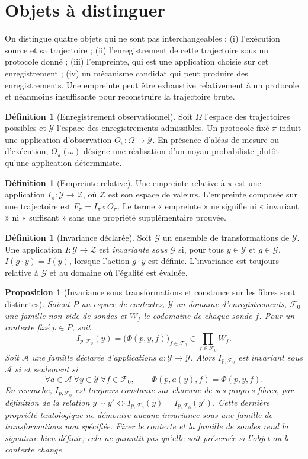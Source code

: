 \documentclass[11pt,oneside]{book}
\newtheorem{proposition}[theoreme]{Proposition}
\theoremstyle{definition}
\newtheorem{definition}[theoreme]{Définition}
\theoremstyle{remark}
\newcommand{\Y}{\mathcal Y}
\newcommand{\Z}{\mathcal Z}
\newcommand{\Fcal}{\mathcal F}
\newcommand{\1}{\mathbf 1}
\begin{document}
\section{Objets à distinguer}
On distingue quatre objets qui ne sont pas interchangeables : (i) l'exécution source et sa trajectoire ; (ii) l'enregistrement de cette trajectoire sous un protocole donné ; (iii) l'empreinte, qui est une application choisie sur cet enregistrement ; (iv) un mécanisme candidat qui peut produire des enregistrements. Une empreinte peut être exhaustive relativement à un protocole et néanmoins insuffisante pour reconstruire la trajectoire brute.

\begin{definition}[Enregistrement observationnel]
Soit \(\Omega\) l'espace des trajectoires possibles et \(\Y\) l'espace des enregistrements admissibles. Un protocole fixé \(\pi\) induit une application d'observation \(O_\pi:\Omega\to\Y\). En présence d'aléas de mesure ou d'exécution, \(O_\pi(\omega)\) désigne une réalisation d'un noyau probabiliste plutôt qu'une application déterministe.
\end{definition}
\begin{definition}[Empreinte relative]
Une empreinte relative à \(\pi\) est une application \(I_\pi:\Y\to\Z\), où \(\Z\) est son espace de valeurs. L'empreinte composée sur une trajectoire est \(F_\pi=I_\pi\circ O_\pi\). Le terme « empreinte » ne signifie ni « invariant » ni « suffisant » sans une propriété supplémentaire prouvée.
\end{definition}
\begin{definition}[Invariance déclarée]
Soit \(\mathcal G\) un ensemble de transformations de \(\Y\). Une application \(I:\Y\to\Z\) est \emph{invariante sous} \(\mathcal G\) si, pour tous \(y\in\Y\) et \(g\in\mathcal G\), \(I(g\cdot y)=I(y)\), lorsque l'action \(g\cdot y\) est définie. L'invariance est toujours relative à \(\mathcal G\) et au domaine où l'égalité est évaluée.
\end{definition}
\begin{proposition}[Invariance sous transformations et constance sur les fibres sont distinctes]
Soient $P$ un espace de contextes, $\Y$ un domaine d'enregistrements, $\Fcal_0$ une famille non vide de sondes et $W_f$ le codomaine de chaque sonde $f$. Pour un contexte fixé $p\in P$, soit
\[
 I_{p,\Fcal_0}(y)=\bigl(\Phi(p,y,f)\bigr)_{f\in\Fcal_0}\in\prod_{f\in\Fcal_0}W_f.
\]
Soit $\mathcal A$ une famille déclarée d'applications $a:\Y\to\Y$. Alors $I_{p,\Fcal_0}$ est invariant sous $\mathcal A$ si et seulement si
\[
 \forall a\in\mathcal A\ \forall y\in\Y\ \forall f\in\Fcal_0,\qquad
 \Phi(p,a(y),f)=\Phi(p,y,f).
\]
En revanche, $I_{p,\Fcal_0}$ est toujours constante sur chacune de ses propres fibres, par définition de la relation $y\sim y'\iff I_{p,\Fcal_0}(y)=I_{p,\Fcal_0}(y')$. Cette dernière propriété tautologique ne démontre aucune invariance sous une famille de transformations non spécifiée. Fixer le contexte et la famille de sondes rend la signature bien définie; cela ne garantit pas qu'elle soit préservée si l'objet ou le contexte change.
\end{proposition}
\end{document}
